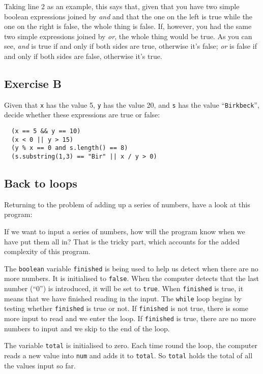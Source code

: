 Taking line 2 as an example, this says that, given that you have two simple
boolean expressions joined by \emph{and} and that the one on the left is
true while the one on the right is false, the whole thing is false.  If,
however, you had the same two simple expressions joined by \emph{or}, the
whole thing would be true. As you can see, \emph{and} is true if and
only if both sides are true, otherwise it's false; \emph{or} is false
if and only if both sides are false, otherwise it's true.

\subsection*{Exercise B}

Given that \texttt{x} has the value 5, \texttt{y} has the value 20,
and \texttt{s} has the value ``\texttt{Birkbeck}'', decide whether these
expressions are true or false:

\begin{verbatim}
  (x == 5 && y == 10)
  (x < 0 || y > 15)
  (y % x == 0 and s.length() == 8)
  (s.substring(1,3) == "Bir" || x / y > 0)
\end{verbatim}

\subsection{Back to loops}

Returning to the problem of adding up a series of numbers, have a
look at this program:


If we want to input a series of numbers, how will the program know
when we have put them all in?  That is the tricky part, which accounts
for the added complexity of this program.

The \texttt{boolean} variable
\texttt{finished} is being used to help us detect when there are no more
numbers. It is initialised to \texttt{false}.  When the computer detects
that the last number (``0'') is introduced, it will be set to \texttt{true}.
When \texttt{finished} is true, it means that we have finished reading in
the input. The \texttt{while} loop begins by testing whether \texttt{finished}
is true or not.  If \texttt{finished} is not true, there is some more input
to read and we enter the loop. If \texttt{finished} is true, there are
no more numbers to input and we skip to the end of the loop.

The variable \texttt{total} is initialised to zero.
Each time round the loop, the computer reads a new value into \texttt{num}
and adds it to \texttt{total}. So \texttt{total} holds the total of all
the values input so far.

